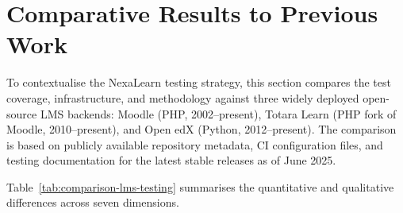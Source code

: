 
\section{Comparative Results to Previous Work}
\label{sec:comparative-results}

To contextualise the NexaLearn testing strategy, this section compares the test coverage, infrastructure, and methodology against three widely deployed open-source LMS backends: Moodle (PHP, 2002--present), Totara Learn (PHP fork of Moodle, 2010--present), and Open edX (Python, 2012--present). The comparison is based on publicly available repository metadata, CI configuration files, and testing documentation for the latest stable releases as of June 2025.

Table~\ref{tab:comparison-lms-testing} summarises the quantitative and qualitative differences across seven dimensions.

